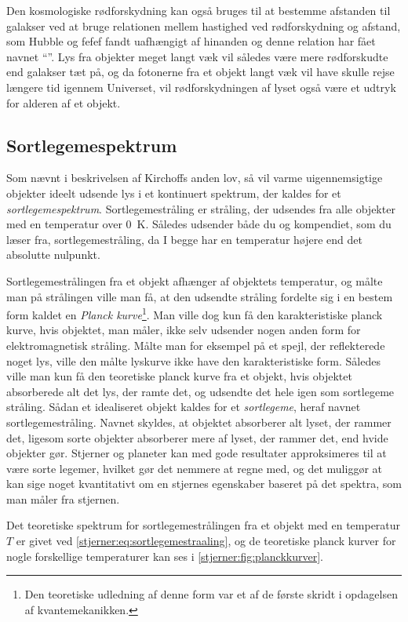 \documentclass[crop=false, class=memoir]{standalone}
\begin{document}
Den kosmologiske rødforskydning kan også bruges til at bestemme afstanden til galakser ved at bruge relationen mellem hastighed ved rødforskydning og afstand, som Hubble og fefef fandt uafhængigt af hinanden og denne relation har fået navnet ``''. Lys fra objekter meget langt væk vil således være mere rødforskudte end galakser tæt på, og da fotonerne fra et objekt langt væk vil have skulle rejse længere tid igennem Universet, vil rødforskydningen af lyset også være et udtryk for alderen af et objekt.

\subsection{Sortlegemespektrum}\label{stjerner:sec:sortlegeme}

Som nævnt i beskrivelsen af Kirchoffs anden lov, så vil varme uigennemsigtige objekter ideelt udsende lys i et kontinuert spektrum, der kaldes for et \emph{sortlegemespektrum}. Sortlegemestråling er stråling, der udsendes fra alle objekter med en temperatur over \SI{0}{\kelvin}. Således udsender både du og kompendiet, som du læser fra, sortlegemestråling, da I begge har en temperatur højere end det absolutte nulpunkt.

Sortlegemestrålingen fra et objekt afhænger af objektets temperatur, og målte man på strålingen ville man få, at den udsendte stråling fordelte sig i en bestem form kaldet en \emph{Planck kurve}\footnote{Den teoretiske udledning af denne form var et af de første skridt i opdagelsen af kvantemekanikken.}. Man ville dog kun få den karakteristiske planck kurve, hvis objektet, man måler, ikke selv udsender nogen anden form for elektromagnetisk stråling. Målte man for eksempel på et spejl, der reflekterede noget lys, ville den målte lyskurve ikke have den karakteristiske form. Således ville man kun få den teoretiske planck kurve fra et objekt, hvis objektet absorberede alt det lys, der ramte det, og udsendte det hele igen som sortlegeme stråling. Sådan et idealiseret objekt kaldes for et \emph{sortlegeme}, heraf navnet sortlegemestråling. Navnet skyldes, at objektet absorberer alt lyset, der rammer det, ligesom sorte objekter absorberer mere af lyset, der rammer det, end hvide objekter gør. Stjerner og planeter kan med gode resultater approksimeres til at være sorte legemer, hvilket gør det nemmere at regne med, og det muliggør at kan sige noget kvantitativt om en stjernes egenskaber baseret på det spektra, som man måler fra stjernen.

Det teoretiske spektrum for sortlegemestrålingen fra et objekt med en temperatur $T$ er givet ved \cref{stjerner:eq:sortlegemestraaling}, og de teoretiske planck kurver for nogle forskellige temperaturer kan ses i \cref{stjerner:fig:planckkurver}. 
\end{document}
